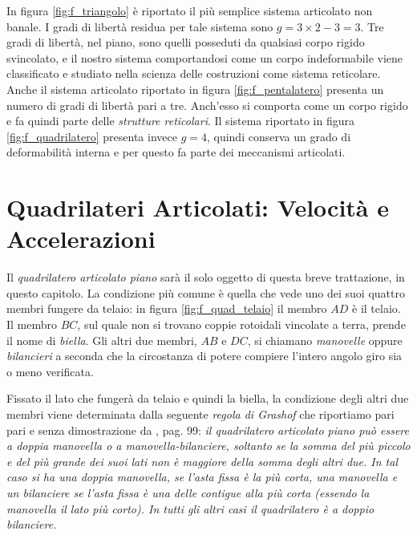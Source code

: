 \noindent In figura \ref{fig:f_triangolo} \`e riportato il pi\`u semplice sistema
articolato non banale. I gradi di libert\`a residua per tale sistema sono
$g=3\times 2- 3=3$. Tre gradi di libert\`a, nel piano, sono quelli posseduti da
qualsiasi corpo rigido svincolato, e il nostro sistema comportandosi come
un corpo indeformabile  viene classificato
e studiato nella  scienza delle costruzioni come sistema reticolare. Anche il sistema
articolato riportato in figura \ref{fig:f_pentalatero} presenta un numero di gradi
di libert\`a pari a tre. Anch'esso si comporta come un corpo rigido e fa quindi 
parte delle {\em strutture reticolari}.
Il sistema riportato in figura \ref{fig:f_quadrilatero} presenta invece  $g=4$,
quindi conserva un grado di deformabilit\`a interna e per questo fa parte dei
meccanismi articolati.


\section{Quadrilateri Articolati: Velocit\`a e Accelerazioni}

\noindent Il {\em quadrilatero articolato piano}
sar\`a il solo oggetto di questa breve trattazione, in questo capitolo.
La condizione pi\`u comune \`e quella che vede
uno dei suoi quattro membri fungere da telaio: in figura
\ref{fig:f_quad_telaio} il membro $AD$ \`e il telaio. 
Il membro $BC$, sul quale non si trovano coppie rotoidali vincolate
a terra, prende il nome di {\em biella}. Gli altri due membri, $AB$ e $DC$, 
si chiamano {\em manovelle} oppure
{\em bilancieri} a seconda che la circostanza di potere
compiere l'intero angolo giro sia o meno verificata.

\noindent Fissato il lato che funger\`a da telaio e quindi la biella, la condizione degli
altri due membri viene determinata dalla seguente
{\em regola di Grashof}
che riportiamo pari pari e senza dimostrazione da \cite{sesini1}, pag. 99:
{\em il quadrilatero articolato piano pu\`o essere a doppia manovella o
a manovella-bilanciere,
soltanto se la somma del pi\`u piccolo e del pi\`u grande dei suoi lati non \`e
maggiore della somma degli altri due. In tal caso si ha una doppia manovella,
se l'asta fissa \`e la pi\`u corta, una manovella e un bilanciere se l'asta
fissa \`e una delle contigue alla pi\`u corta (essendo la manovella il lato pi\`u corto).
In tutti gli altri casi il quadrilatero \`e a doppio bilanciere}.

